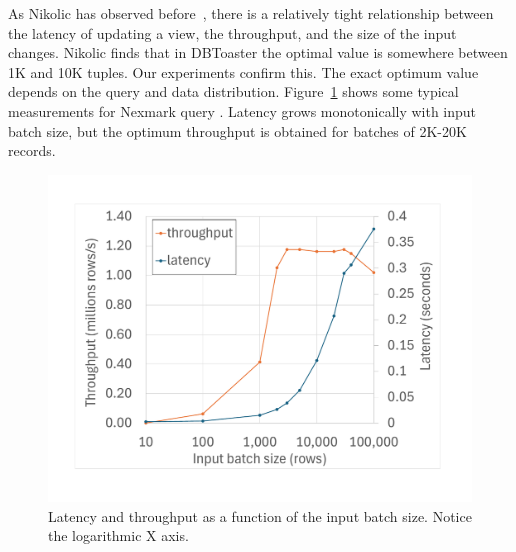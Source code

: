 As Nikolic has observed before~\cite{nikolic-sigmod16}, there is a
relatively tight relationship between the latency of updating a view,
the throughput, and the size of the input changes.  Nikolic finds that
in DBToaster the optimal value is somewhere between 1K and 10K tuples.
Our experiments confirm this.  The exact optimum value depends on the
query and data distribution.  Figure~\ref{fig:batchsize} shows some
typical measurements for Nexmark query .  Latency grows
monotonically with input batch size, but the optimum throughput is
obtained for batches of 2K-20K records.

\begin{figure}[h]
  \includegraphics[width=.90\columnwidth]{graph/batchsize}
  \caption{Latency and throughput as a function of the input batch
    size.  Notice the logarithmic X axis.\label{fig:batchsize}}
\end{figure}

